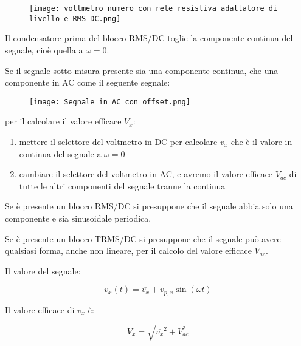 \begin{figure}[h]
    \centering
    \texttt{[image: voltmetro numero con rete resistiva adattatore di livello e RMS-DC.png]}
\end{figure}

Il condensatore prima del blocco RMS/DC toglie la componente continua del segnale, cioè quella a $\omega = 0$. \newline 

\newpage

Se il segnale sotto misura presente sia una componente continua, che una componente in AC come il seguente segnale: 

\begin{figure}[h]
    \centering
    \texttt{[image: Segnale in AC con offset.png]}
\end{figure}

per il calcolare il valore efficace $V_x$: 

\begin{enumerate}
    \item mettere il selettore del voltmetro in DC per calcolare $\overline{v_x}$ che è il valore in continua del segnale a $\omega = 0$
    \item cambiare il selettore del voltmetro in AC, e avremo il valore efficace $V_{ac}$ di tutte le altri componenti del segnale tranne la continua  
\end{enumerate}

Se è presente un blocco RMS/DC si presuppone che il segnale abbia solo una componente e sia sinusoidale periodica. \newline 

Se è presente un blocco TRMS/DC si presuppone che il segnale può avere qualsiasi forma, anche non lineare, per il calcolo del valore efficace $V_{ac}$. \newline 

Il valore del segnale: 

{
    \Large
    \begin{equation}
        v_x(t)
        = 
        \overline{v_x}
        + 
        v_{p, x} \sin(\omega t)
    \end{equation}
}

Il valore efficace di $v_x$ è: 

{
    \Large
    \begin{equation}
        V_x
        = 
        \sqrt{\overline{v_x}^{2} + V_{ac}^{2}}
    \end{equation}
}

